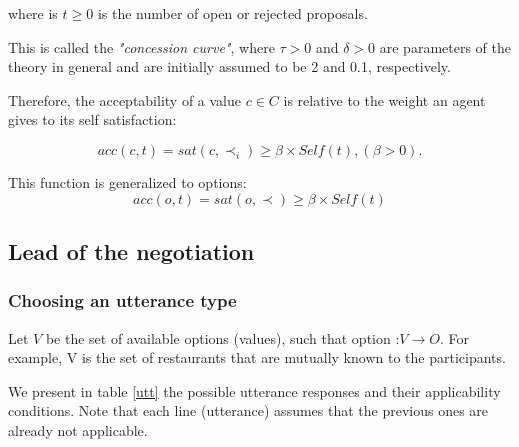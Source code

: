 \documentclass{llncs}
\begin{document}
	
	where is $t \geq 0$ is the number of open or rejected proposals.
	
	This is called the \emph{"concession curve"}, where $\tau > 0$ and $\delta > 0$
	are parameters of the theory in general and are initially assumed to
	be 2 and 0.1, respectively.
	
	Therefore, the acceptability of a value $c \in C$  is relative to the weight an agent gives to its self satisfaction:
	
	\begin{equation}
	acc(c, t) = sat(c, \prec_i) \geq  \beta \times Self(t) ,  (\beta >0).
	\end{equation}
	
	This function is generalized to options:
	\begin{equation}
	acc(o, t) = sat(o, \prec) \geq  \beta \times Self(t)
	\end{equation}
	
	
	
	\subsection{Lead of the negotiation}
	

	\subsubsection{Choosing an utterance type}
	Let $V$ be the set of available options (values), such that option :$ V\rightarrow O$. For example, V is the set of restaurants that are mutually known to the participants. 
	
	We present in table \ref{utt} the possible utterance responses and their applicability conditions. Note that each line (utterance) assumes that the previous ones are already not applicable.%
	
\end{document}
